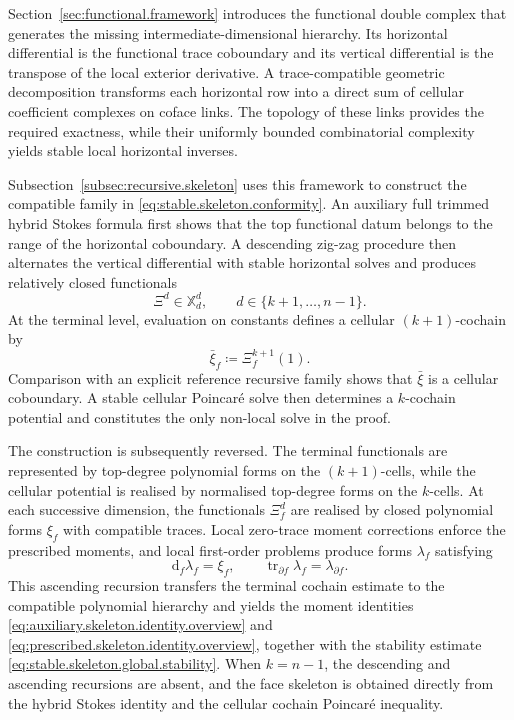 \documentclass[a4paper,11pt]{article}
\theoremstyle{definition}
\newcommand{\DIFF}{\mathrm{d}}
\newcommand{\trc}{\operatorname{tr}}
\begin{document}
Section~\ref{sec:functional.framework} introduces the functional double complex that generates the missing intermediate-dimensional hierarchy.
Its horizontal differential is the functional trace coboundary and its vertical differential is the transpose of the local exterior derivative.
A trace-compatible geometric decomposition transforms each horizontal row into a direct sum of cellular coefficient complexes on coface links.
The topology of these links provides the required exactness, while their uniformly bounded combinatorial complexity yields stable local horizontal inverses.

Subsection~\ref{subsec:recursive.skeleton} uses this framework to construct the compatible family in \eqref{eq:stable.skeleton.conformity}.
An auxiliary full trimmed hybrid Stokes formula first shows that the top functional datum belongs to the range of the horizontal coboundary.
A descending zig-zag procedure then alternates the vertical differential with stable horizontal solves and produces relatively closed functionals
\[
  \Xi^d
  \in
  \mathbb X_d^d,
  \qquad
  d\in\{k+1,\ldots,n-1\}.
\]
At the terminal level, evaluation on constants defines a cellular $(k+1)$-cochain by
\[
  \bar\xi_f
  \coloneqq
  \Xi_f^{k+1}(1).
\]
Comparison with an explicit reference recursive family shows that $\bar\xi$ is a cellular coboundary.
A stable cellular Poincar\'e solve then determines a $k$-cochain potential and constitutes the only non-local solve in the proof.

The construction is subsequently reversed.
The terminal functionals are represented by top-degree polynomial forms on the $(k+1)$-cells, while the cellular potential is realised by normalised top-degree forms on the $k$-cells.
At each successive dimension, the functionals $\Xi_f^d$ are realised by closed polynomial forms $\xi_f$ with compatible traces.
Local zero-trace moment corrections enforce the prescribed moments, and local first-order problems produce forms $\lambda_f$ satisfying
\[
  \DIFF_f\lambda_f
  =
  \xi_f,
  \qquad
  \trc_{\partial f}\lambda_f
  =
  \lambda_{\partial f}.
\]
This ascending recursion transfers the terminal cochain estimate to the compatible polynomial hierarchy and yields the moment identities \eqref{eq:auxiliary.skeleton.identity.overview} and \eqref{eq:prescribed.skeleton.identity.overview}, together with the stability estimate \eqref{eq:stable.skeleton.global.stability}.
When $k=n-1$, the descending and ascending recursions are absent, and the face skeleton is obtained directly from the hybrid Stokes identity and the cellular cochain Poincar\'e inequality.
\end{document}
